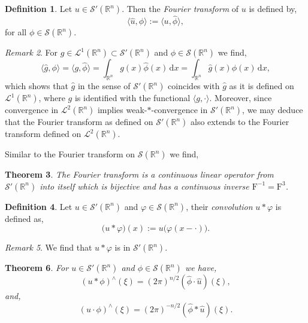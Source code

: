 \documentclass[a4paper, 12pt]{report}
\newtheorem{theorem}{Theorem}[section]
\theoremstyle{remark}
\newtheorem{remark}[theorem]{Remark}
\theoremstyle{definition}
\newtheorem{definition}[theorem]{Definition}
\begin{document}
\begin{definition}
Let $u \in \mathcal{S}'(\mathbb{R}^n)$.  Then the \emph{Fourier transform} of $u$ is defined by,
\begin{equation}
\langle\hat{u}, \phi\rangle := \langle u, \hat{\phi}\rangle,
\end{equation}
for all $\phi \in \mathcal{S}(\mathbb{R}^n)$.
\end{definition}
\begin{remark}
For $g \in \mathcal{L}^1(\mathbb{R}^n) \subset \mathcal{S}'(\mathbb{R}^n)$ and $\phi \in \mathcal{S}(\mathbb{R}^n)$ we find,
$$
\langle\hat{g}, \phi\rangle = \langle g, \hat{\phi}\rangle = \int_{\mathbb{R}^n}g(x)\hat{\phi}(x)\,\mathrm{d}x = \int_{\mathbb{R}^n}\hat{g}(x)\phi(x)\,\mathrm{d}x,
$$
which shows that $\hat{g}$ in the sense of $\mathcal{S}'(\mathbb{R}^n)$ coincides with $\hat{g}$ as it is defined on $\mathcal{L}^1(\mathbb{R}^n)$, where $g$ is identified with the functional $\langle g, \cdot \rangle$.  Moreover, since convergence in $\mathcal{L}^2(\mathbb{R}^n)$ implies weak-$\ast$-convergence in $\mathcal{S}'(\mathbb{R}^n)$, we may deduce that the Fourier transform as defined on $\mathcal{S}'(\mathbb{R}^n)$ also extends to the Fourier transform defined on $\mathcal{L}^2(\mathbb{R}^n)$.
\end{remark}

Similar to the Fourier transform on $\mathcal{S}(\mathbb{R}^n)$ we find,
\begin{theorem}
The Fourier transform is a continuous linear operator from $\mathcal{S}'(\mathbb{R}^n)$ into itself which is bijective and has a continuous inverse $\mathrm{F}^{-1} = \mathrm{F}^3$.
\end{theorem}

\begin{definition}
Let $u \in \mathcal{S}'(\mathbb{R}^n)$ and $\varphi \in \mathcal{S}(\mathbb{R}^n)$, their \emph{convolution} $u \ast \varphi$ is defined as,
\begin{equation}
\big(u \ast \varphi\big)(x) := u\big(\varphi(x - \cdot)\big).
\end{equation}
\end{definition}
\begin{remark}
We find that $u \ast \varphi$ is in $\mathcal{S}'(\mathbb{R}^n)$.
\end{remark}

\begin{theorem}
For $u \in \mathcal{S}'(\mathbb{R}^n)$ and $\phi \in \mathcal{S}(\mathbb{R}^n)$ we have,
\begin{equation}
(u\ast\phi)^\wedge(\xi) = (2\pi)^{n/2}(\hat{\phi}\cdot\hat{u})(\xi),
\end{equation}
and,
\begin{equation}
(u\cdot\phi)^\wedge(\xi) = (2\pi)^{-n/2}(\hat{\phi}\ast\hat{u})(\xi).
\end{equation}
\end{theorem}
\end{document}
